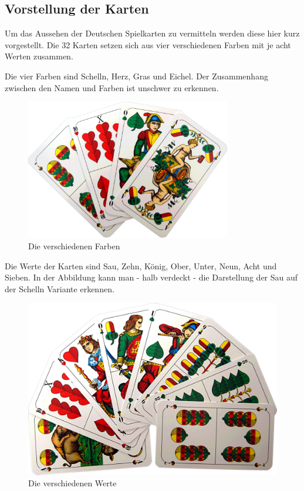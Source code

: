 \documentclass[
							a4paper, 
							11pt, 
							openany, 
							liststotoc,
							parskip=half, 
   							headings=normal
						]{scrreprt}
\begin{document}
{%
\subsection{Vorstellung der Karten} \label{sse:grundlagen_schafkopf_regeln_karten} 
Um das Aussehen der Deutschen Spielkarten zu vermitteln werden diese hier kurz vorgestellt. Die 32 Karten setzen sich aus vier verschiedenen Farben mit je acht Werten zusammen.

Die vier Farben sind Schelln, Herz, Gras und Eichel. Der Zusammenhang zwischen den Namen und Farben ist unschwer zu erkennen.
\begin{figure}[H]
\begin{center}
    \includegraphics[width=0.8\textwidth]{./pictures/cards/colors.jpg}
	\caption[Schafkopf -- Die Farben]{Die verschiedenen Farben} \label{fig:schafkopf_karten_farben}
\end{center}
\end{figure}

\clearpage

Die Werte der Karten sind Sau, Zehn, König, Ober, Unter, Neun, Acht und Sieben. In der Abbildung kann man - halb verdeckt - die Darstellung der Sau auf der Schelln Variante erkennen.

\begin{figure}[H]
\begin{center}
    \includegraphics[width=1.0\textwidth]{./pictures/cards/values.jpg}
	\caption[Schafkopf -- Die Werte]{Die verschiedenen Werte} \label{fig:schafkopf_karten_werte}
\end{center}
\end{figure}

}
\end{document}
